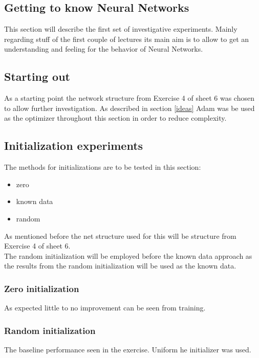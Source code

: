 \documentclass{article}
\begin{document}
\begin{multicols}{2}
\section{Getting to know Neural Networks}
This section will describe the first set of investigative experiments. Mainly regarding stuff of the first couple of lectures its main aim is to allow to get an understanding and feeling for the behavior of Neural Networks.

\subsection{Starting out}
As a starting point the network structure from Exercise 4 of sheet 6 was chosen to allow further investigation. As described in section \ref{ideas} Adam was be used as the optimizer throughout this section in order to reduce complexity.

\subsection{Initialization experiments}
The methods for initializations are to be tested in this section:
\begin{itemize}
	\item zero
	\item known data
	\item random
\end{itemize}
As mentioned before the net structure used for this will be structure from Exercise 4 of sheet 6.\\
The random initialization will be employed before the known data approach as the results from the random initialization will be used as the known data.
\subsubsection{Zero initialization}
As expected little to no improvement can be seen from training.

\subsubsection{Random initialization}
The baseline performance seen in the exercise. Uniform he initializer was used.


\end{multicols}
\end{document}
